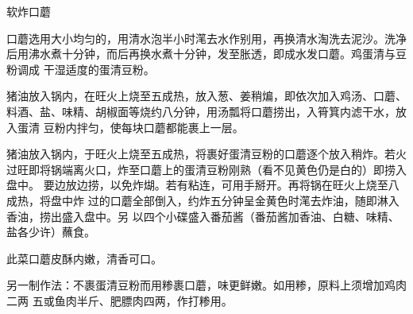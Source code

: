 \begin{recipe}{软炸口蘑}

\ingredients


\preparation

\step 口蘑选用大小均匀的，用清水泡半小时滗去水作别用，再换清水淘洗去泥沙。洗净
后用沸水煮十分钟，而后再换水煮十分钟，发至胀透，即成水发口蘑。鸡蛋清与豆粉调成
干湿适度的蛋清豆粉。

\step 猪油放入锅内，在旺火上烧至五成热，放入葱、姜稍煸，即依次加入鸡汤、口蘑、
料酒、盐、味精、胡椒面等烧约八分钟，用汤瓢将口蘑捞出，入筲箕内滤干水，放入蛋清
豆粉内拌匀，使每块口蘑都能裹上一层。

\step 猪油放入锅内，于旺火上烧至五成热，将裹好蛋清豆粉的口蘑逐个放入稍炸。若火
过旺即将锅端离火口，炸至口蘑上的蛋清豆粉刚熟（看不见黄色仍是白的）即捞入盘中。
要边放边捞，以免炸煳。若有粘连，可用手掰开。再将锅在旺火上烧至八成热，将盘中炸
过的口蘑全部倒入，约炸五分钟呈金黄色时滗去炸油，随即淋入香油，捞出盛入盘中。另
以四个小碟盛入番茄酱（番茄酱加香油、白糖、味精、盐各少许）蘸食。

\features

此菜口蘑皮酥内嫩，清香可口。

另一制作法：不裹蛋清豆粉而用糁裹口蘑，味更鲜嫩。如用糁，原料上须增加鸡肉二两
五或鱼肉半斤、肥膘肉四两，作打糁用。

\end{recipe}

